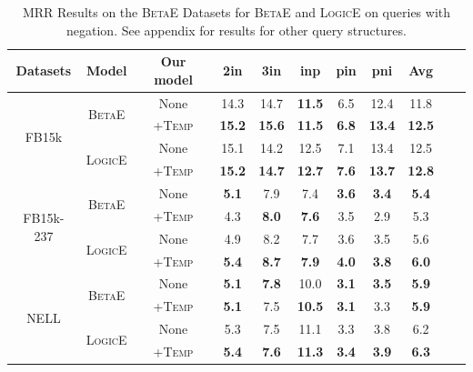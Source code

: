 \begin{table}[!htp]
\renewcommand\arraystretch{0.50}
\setlength{\tabcolsep}{0.22em}
\centering
\small
\begin{tabular*}{\linewidth}{@{}ccccccccccc@{}}
\toprule
\multicolumn{1}{c}{\textbf{Datasets}} & \textbf{Model} & \textbf{Our model} & \textbf{2in} & \textbf{3in} & \textbf{inp} & \textbf{pin} & \textbf{pni} & \textbf{Avg} \\
\midrule
\multirow{4}{*}{FB15k}      
& \multirow{2}{*}{\textsc{BetaE}}    & None   & 14.3  & 14.7 	& \textbf{11.5} 	& 6.5 	& 12.4
& 11.8 \\
&   & +\textsc{Temp}  & \textbf{15.2} 	& \textbf{15.6} 	& \textbf{11.5} 	
& \textbf{6.8} & \textbf{13.4} 	& \textbf{12.5} \\
\cmidrule{2-9}
& \multirow{2}{*}{\textsc{LogicE}}    & None   & 15.1  & 14.2 	& 12.5 	& 7.1 	& 13.4
& 12.5 \\
&   & +\textsc{Temp}  & \textbf{15.2} 	& \textbf{14.7} 	& \textbf{12.7} 	
& \textbf{7.6} & \textbf{13.7} 	& \textbf{12.8} \\
\midrule
\multirow{4}{*}{FB15k-237}      
& \multirow{2}{*}{\textsc{BetaE}}    & None   & \textbf{5.1}  & 7.9 	& 7.4 	& \textbf{3.6} 	& \textbf{3.4}    & \textbf{5.4} \\
&   & +\textsc{Temp}  & 4.3 	& \textbf{8.0} 	& \textbf{7.6} 	& 3.5   & 2.9 	& 5.3 \\
\cmidrule{2-9}
& \multirow{2}{*}{\textsc{LogicE}}    & None   & 4.9  & 8.2 	& 7.7 	& 3.6 	& 3.5   & 5.6 \\
&   & +\textsc{Temp}  & \textbf{5.4} 	& \textbf{8.7} 	& \textbf{7.9} 	& \textbf{4.0}
& \textbf{3.8} 	& \textbf{6.0} \\
\midrule
\multirow{4}{*}{NELL}      
& \multirow{2}{*}{\textsc{BetaE}}    & None   & \textbf{5.1}  & \textbf{7.8} 	& 10.0 	
& \textbf{3.1} 	& \textbf{3.5}    & \textbf{5.9} \\
&   & +\textsc{Temp}  & \textbf{5.1} 	& 7.5 	& \textbf{10.5} 	& \textbf{3.1}   & 3.3 	
& \textbf{5.9} \\
\cmidrule{2-9}
& \multirow{2}{*}{\textsc{LogicE}}    & None   & 5.3  & 7.5 	& 11.1 	& 3.3 	& 3.8   & 6.2 \\
&   & +\textsc{Temp}  & \textbf{5.4} 	& \textbf{7.6} 	& \textbf{11.3} 	& \textbf{3.4}
& \textbf{3.9} 	& \textbf{6.3} \\
\bottomrule
\end{tabular*}
\caption{MRR Results on the \textsc{BetaE} Datasets for \textsc{BetaE} and \textsc{LogicE} on queries with negation. See appendix  for  results for other query structures.}
\label{table_3}
\end{table}


